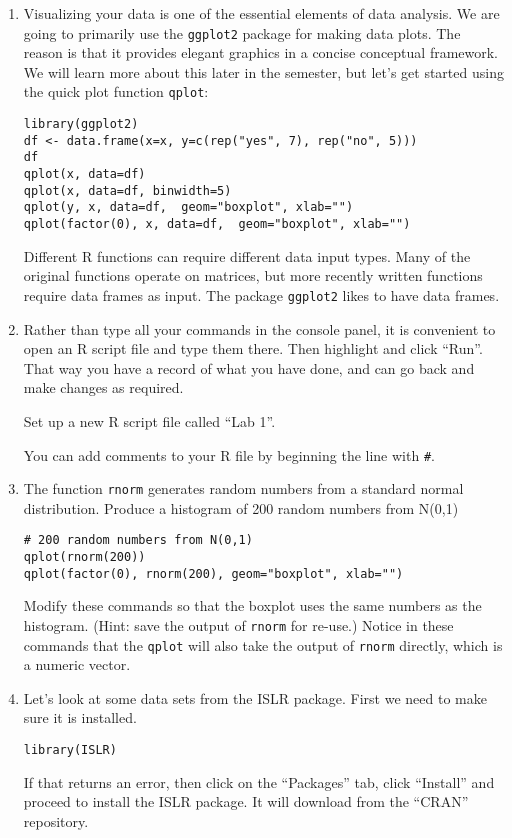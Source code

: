 \documentclass[11pt]{article}
\begin{document}
\begin{enumerate}
\item Visualizing your data is one of the essential elements of data analysis. We are going to primarily use the \verb|ggplot2| package for making data plots. The reason is that it provides elegant graphics in a concise conceptual framework. We will learn more about this later in the semester, but let's get started using the quick plot function \verb|qplot|:

\begin{verbatim}
library(ggplot2)
df <- data.frame(x=x, y=c(rep("yes", 7), rep("no", 5)))
df
qplot(x, data=df)
qplot(x, data=df, binwidth=5)
qplot(y, x, data=df,  geom="boxplot", xlab="")
qplot(factor(0), x, data=df,  geom="boxplot", xlab="")
\end{verbatim}

Different R functions can require different data input types. Many of the original functions operate on matrices, but more recently written functions require data frames as input. The package \verb|ggplot2| likes to have data frames. 

\item Rather than type all your commands in the console panel, it is convenient to open an R script file and type them there. Then highlight and click ``Run''. That way you have a record of what you have done, and can go back and make changes as required.

Set up a new R script file called ``Lab 1''.

You can add comments to your R file by beginning the line with \verb|#|.

\item The function \verb|rnorm| generates random numbers from a standard normal distribution. 
Produce a histogram of 200 random numbers from N(0,1)
\begin{verbatim}
# 200 random numbers from N(0,1)
qplot(rnorm(200)) 
qplot(factor(0), rnorm(200), geom="boxplot", xlab="")
\end{verbatim}

Modify these commands so that the boxplot uses the same numbers as the histogram. (Hint: save the output of \verb|rnorm| for re-use.) Notice in these commands that the \verb|qplot| will also take the output of \verb|rnorm| directly, which is a numeric vector.

\item  Let's look at some data sets from the ISLR package. First we need to make sure it is installed.
\begin{verbatim}
library(ISLR)
\end{verbatim}
If that returns an error, then click on the ``Packages'' tab, click ``Install'' and proceed to install the ISLR package. It will download from the ``CRAN'' repository.


\end{enumerate}
\end{document}
